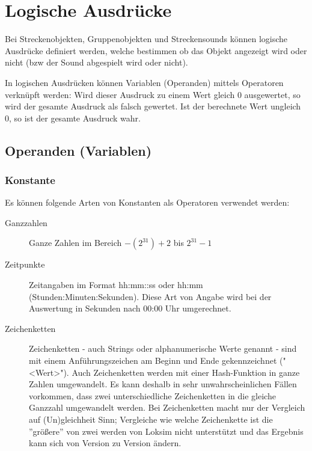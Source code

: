 \section{Logische Ausdrücke}
\label{sec.editor.obj.logischeausdruecke}

Bei Streckenobjekten, Gruppenobjekten und Streckensounds können logische
Ausdrücke definiert werden, welche bestimmen ob das Objekt angezeigt
wird oder nicht (bzw der Sound abgespielt wird oder nicht).

In logischen Ausdrücken können Variablen (Operanden) mittels Operatoren
verknüpft werden: Wird dieser Ausdruck zu einem Wert gleich 0
ausgewertet, so wird der gesamte Ausdruck als falsch gewertet. Ist der
berechnete Wert ungleich 0, so ist der gesamte Ausdruck wahr.


\subsection{Operanden (Variablen)}

\subsubsection{Konstante}
Es können folgende Arten von Konstanten als Operatoren verwendet werden:
\begin{description}
\item[Ganzzahlen] Ganze Zahlen im Bereich $-(2^{31}) + 2$ bis $2^{31} - 1$
\item[Zeitpunkte] Zeitangaben im Format hh:mm::ss oder hh:mm (Stunden:Minuten:Sekunden). Diese Art von  Angabe wird bei der Auswertung in Sekunden nach 00:00 Uhr umgerechnet.
\item[Zeichenketten] Zeichenketten - auch Strings oder alphanumerische Werte genannt - sind mit einem Anführungszeichen am Beginn und Ende gekennzeichnet ("<Wert>"). Auch Zeichenketten werden mit einer Hash-Funktion in ganze Zahlen umgewandelt. Es kann deshalb in sehr unwahrscheinlichen Fällen vorkommen, dass zwei unterschiedliche Zeichenketten in die gleiche Ganzzahl umgewandelt werden. Bei Zeichenketten macht nur der Vergleich auf (Un)gleichheit Sinn; Vergleiche wie welche Zeichenkette ist die ''größere'' von zwei werden von Loksim nicht unterstützt und das Ergebnis kann sich von Version zu Version ändern.
\end{description}

